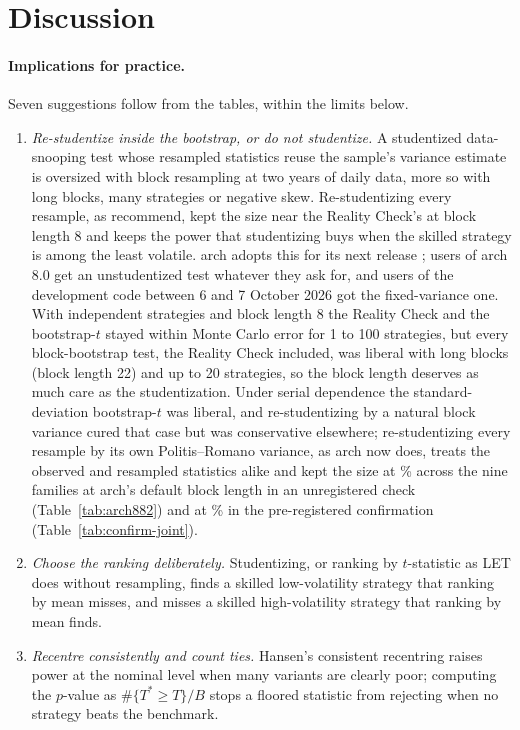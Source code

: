 \section{Discussion}
\label{sec:discussion}

\paragraph{Implications for practice.} Seven suggestions follow from the tables, within the limits below.
\begin{enumerate}
  \item \emph{Re-studentize inside the bootstrap, or do not studentize.} A studentized data-snooping test whose resampled statistics reuse the sample's variance estimate is oversized with block resampling at two years of daily data, more so with long blocks, many strategies or negative skew. Re-studentizing every resample, as \citet{romano2005stepwise} recommend, kept the size near the Reality Check's at block length 8 and keeps the power that studentizing buys when the skilled strategy is among the least volatile. arch adopts this for its next release \citep{arch882}; users of arch 8.0 get an unstudentized test whatever they ask for, and users of the development code between 6 and 7 October 2026 got the fixed-variance one.
  With independent strategies and block length 8 the Reality Check and the bootstrap-$t$ stayed within Monte Carlo error for 1 to 100 strategies, but every block-bootstrap test, the Reality Check included, was liberal with long blocks (block length 22) and up to 20 strategies, so the block length deserves as much care as the studentization. Under serial dependence the standard-deviation bootstrap-$t$ was liberal, and re-studentizing by a natural block variance cured that case but was conservative elsewhere; re-studentizing every resample by its own Politis--Romano variance, as arch now does, treats the observed and resampled statistics alike and kept the size at \% across the nine families at arch's default block length in an unregistered check (Table~\ref{tab:arch882}) and at \% in the pre-registered confirmation (Table~\ref{tab:confirm-joint}).
  \item \emph{Choose the ranking deliberately.} Studentizing, or ranking by $t$-statistic as LET does without resampling, finds a skilled low-volatility strategy that ranking by mean misses, and misses a skilled high-volatility strategy that ranking by mean finds.
  \item \emph{Recentre consistently and count ties.} Hansen's consistent recentring raises power at the nominal level when many variants are clearly poor; computing the $p$-value as $\#\{T^*\ge T\}/B$ stops a floored statistic from rejecting when no strategy beats the benchmark.

\end{enumerate}
